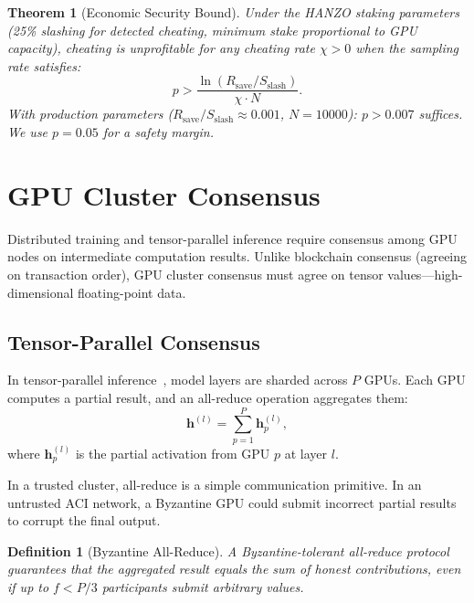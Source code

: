 \documentclass[11pt]{article}
\newtheorem{theorem}{Theorem}
\newtheorem{definition}{Definition}
\begin{document}
\begin{theorem}[Economic Security Bound]
Under the HANZO staking parameters~\cite{hanzotokenomics} (25\% slashing for
detected cheating, minimum stake proportional to GPU capacity), cheating is
unprofitable for any cheating rate $\chi > 0$ when the sampling rate satisfies:
\begin{equation}
p > \frac{\ln(R_{\text{save}} / S_{\text{slash}})}{\chi \cdot N}.
\end{equation}
With production parameters ($R_{\text{save}} / S_{\text{slash}} \approx 0.001$,
$N = 10000$): $p > 0.007$ suffices. We use $p = 0.05$ for a safety margin.
\end{theorem}

\section{GPU Cluster Consensus}
\label{sec:cluster}

Distributed training and tensor-parallel inference require consensus among GPU
nodes on intermediate computation results. Unlike blockchain consensus (agreeing
on transaction order), GPU cluster consensus must agree on tensor values---high-dimensional floating-point data.

\subsection{Tensor-Parallel Consensus}

In tensor-parallel inference~\cite{megatron}, model layers are sharded across
$P$ GPUs. Each GPU computes a partial result, and an all-reduce operation
aggregates them:
\begin{equation}
\mathbf{h}^{(l)} = \sum_{p=1}^{P} \mathbf{h}_p^{(l)},
\end{equation}
where $\mathbf{h}_p^{(l)}$ is the partial activation from GPU $p$ at layer $l$.

In a trusted cluster, all-reduce is a simple communication primitive. In an
untrusted ACI network, a Byzantine GPU could submit incorrect partial results
to corrupt the final output.

\begin{definition}[Byzantine All-Reduce]
A Byzantine-tolerant all-reduce protocol guarantees that the aggregated result
equals the sum of honest contributions, even if up to $f < P/3$ participants
submit arbitrary values.
\end{definition}
\end{document}
